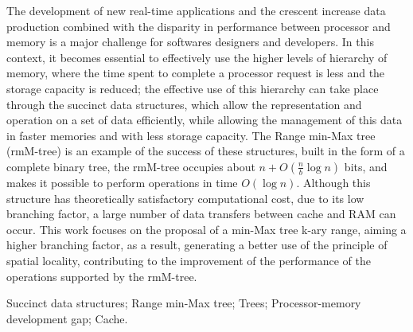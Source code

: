 The development of new real-time applications and the crescent increase data production combined with the disparity in performance between  processor and memory is a major challenge for softwares designers and developers. In this context, it becomes essential to effectively use the higher levels of hierarchy of memory, where the time spent to complete a processor  request is less and the storage capacity is reduced;  the effective use of this hierarchy can take place through the succinct data structures, which allow the representation and operation on a set of data efficiently,  while allowing the management of this data in faster memories and with  less storage capacity. The Range min-Max tree (rmM-tree) is an example of the success of these structures, built in the form of a complete binary tree, the rmM-tree occupies  about $n + O (\frac {n} {b} \log n)$ bits, and makes it possible to perform operations in time $O(\log n)$.  Although this structure has theoretically satisfactory computational cost, due to its low branching factor, a large number of data transfers between  cache and RAM can occur. This work focuses on the proposal of a min-Max tree k-ary range, aiming a higher branching factor, as a result, generating a better use of the principle of spatial locality, contributing to the improvement of the performance of the operations supported by the rmM-tree.

\begin{keywords}
Succinct data structures; Range min-Max tree; Trees; Processor-memory development gap; Cache.
\end{keywords}